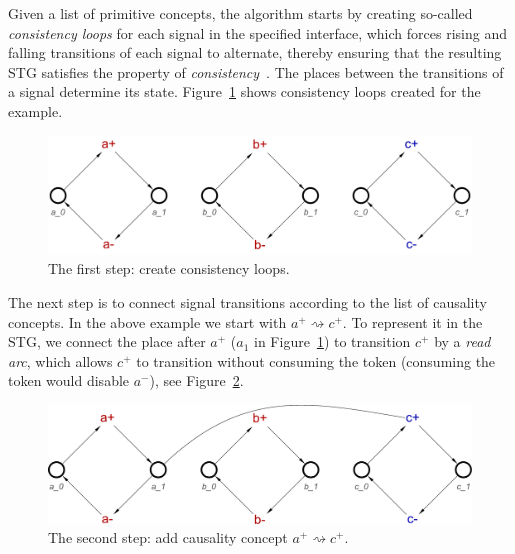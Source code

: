 \documentclass[british, journal]{IEEEtran}
\begin{document}
Given a list of primitive concepts, the algorithm starts by creating so-called
\emph{consistency loops} for each signal in the specified interface, which
forces rising
and falling transitions of each signal to alternate, thereby ensuring that the
resulting
STG satisfies the property of \emph{consistency}~\cite{Cortadella}.
The places between the transitions of a signal determine its state.
Figure~\ref{fig:step-by-step1} shows consistency loops created for the example.
\vspace{-2mm}
\begin{figure}[h]
\begin{centering}
\includegraphics[scale=0.23]{Images/Step-by-step1}
\par
\protect\caption{\label{fig:step-by-step1}The first step: create consistency
loops.}
\vspace{-2mm}
\end{centering}
\end{figure}

The next step is to connect signal transitions according to the list of
causality
concepts. In the above example we start with $a^{+}\rightsquigarrow c^{+}$.
To represent it in the STG, we connect the place after $a^{+}$ ($a_1$ in
Figure~\ref{fig:step-by-step1}) to transition $c^{+}$ by a \emph{read arc},
which allows $c^{+}$ to transition without consuming the token (consuming
the token would disable $a^{-}$), see Figure~\ref{fig:step-by-step2}.

\vspace{-2mm}
\begin{figure}[h]
\begin{centering}
\includegraphics[scale=0.23]{Images/Step-by-step2}
\par
\protect\caption{\label{fig:step-by-step2}The second step: add causality concept
$a^{+}\rightsquigarrow c^{+}$.}
\vspace{-2mm}
\end{centering}
\end{figure}
\end{document}

